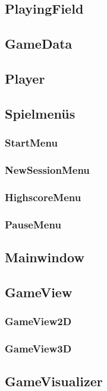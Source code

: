 \documentclass[a4paper]{scrartcl}
\begin{document}
\subsection{PlayingField}\label{ch:PlayingField}
\subsection{GameData}\label{ch:GameData}
\subsection{Player}\label{ch:Player}


\subsection{Spielmenüs}\label{ch:Spielmenüs}
\subsubsection{StartMenu}\label{ch:StartMenu}
\subsubsection{NewSessionMenu}\label{ch:NewSessionMenu}
\subsubsection{HighscoreMenu}\label{ch:HighscoreMenu}
\subsubsection{PauseMenu}\label{ch:PauseMenu}

\subsection{Mainwindow}\label{ch:Mainwindow}
\subsection{GameView}\label{ch:GameView}
\subsubsection{GameView2D}\label{ch:GameView2D}
\subsubsection{GameView3D}\label{ch:GameView3D}
\subsection{GameVisualizer}\label{ch:GameVisualizer}
\end{document}
